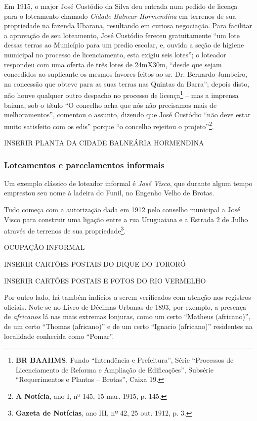 Em 1915, o major José Custódio da Silva deu entrada num pedido de licença para o loteamento chamado \textit{Cidade Balnear Hormendina} em terrenos de sua propriedade na fazenda Ubarana, resultando em curiosa negociação. Para facilitar a aprovação de seu loteamento, José Custódio fereceu gratuitamente ``um lote dessas terras ao Município para um predio escolar, e, ouvida a seção de higiene municipal no processo de licenciamento, esta exigiu seis lotes''; o loteador respondeu com uma oferta de três lotes de 24mX30m, ``desde que sejam concedidos ao suplicante os mesmos favores feitos ao sr. Dr. Bernardo Jambeiro, na concessão que obteve para as suas terras nas Quintas da Barra''; depois disto, não houve qualquer outro despacho no processo de licença\footnote{\textbf{BR BAAHMS}, Fundo ``Intendência e Prefeitura'', Série ``Processos de Licenciamento de Reforma e Ampliação de Edificações'', Subsérie ``Requerimentos e Plantas -- Brotas'', Caixa 19.} -- mas a imprensa baiana, sob o título ``O concelho acha que nós não precisamos mais de melhoramentos'', comentou o assunto, dizendo que José Custódio ``não deve estar muito satisfeito com os edis'' porque ``o concelho rejeitou o projeto''\footnote{\textbf{A Notícia}, ano I, nº 145, 15 mar. 1915, p. 145.}.

INSERIR PLANTA DA CIDADE BALNEÁRIA HORMENDINA




\subsubsection{Loteamentos e parcelamentos informais}



Um exemplo clássico de loteador informal é \textit{José Visco}, que durante algum tempo emprestou seu nome à ladeira do Funil, no Engenho Velho de Brotas. 

Tudo começa com a autorização dada em 1912 pelo conselho municipal a José Visco para construir uma ligação entre a rua Uruguaiana e a Estrada 2 de Julho através de terrenos de sua propriedade\footnote{\textbf{Gazeta de Notícias}, ano III, nº 42, 25 out. 1912, p. 3.}.

OCUPAÇÃO INFORMAL



INSERIR CARTÕES POSTAIS DO DIQUE DO TORORÓ

INSERIR CARTÕES POSTAIS E FOTOS DO RIO VERMELHO

Por outro lado, há também indícios a serem verificados com atenção nos registros oficiais. Note-se no Livro de Décimas Urbanas de 1893, por exemplo, a presença de \textit{africanos} lá nas mais extremas lonjuras, como um certo ``Matheus (africano)'', de um certo ``Thomas (africano)'' e de um certo ``Ignacio (africano)'' residentes na localidade conhecida como ``Pomar''.

